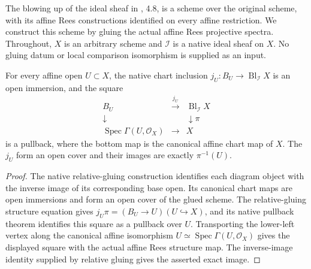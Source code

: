 \endgroup

\begingroup

The blowing up of the ideal sheaf in \cite{deJong1996}, 4.8, is a
scheme over the original scheme, with its affine Rees constructions
identified on every affine restriction. We construct this scheme by
gluing the actual affine Rees projective spectra. Throughout, $X$ is
an arbitrary scheme and $\mathcal I$ is a native ideal sheaf on $X$.
No gluing datum or local comparison isomorphism is supplied as an input.

\begin{theorem}
\label{thm:global-native-blowup-affine-pullback}
\leanok
For every affine open $U\subset X$, the native chart inclusion
$j_U:B_U\to\operatorname{Bl}_{\mathcal I}X$ is an open immersion,
and the square
\[
\begin{array}{ccc}
B_U&\xrightarrow{j_U}&\operatorname{Bl}_{\mathcal I}X\\
\downarrow&&\downarrow\pi\\
\operatorname{Spec}\Gamma(U,\mathcal O_X)&\longrightarrow&X
\end{array}
\]
is a pullback, where the bottom map is the canonical affine chart
map of $X$. The $j_U$ form an open cover and their images are exactly
$\pi^{-1}(U)$.
\end{theorem}
\begin{proof}
The native relative-gluing construction identifies each diagram
object with the inverse image of its corresponding base open.
Its canonical chart maps are open immersions and form an open cover
of the glued scheme. The relative-gluing structure equation gives
$j_U\pi=(B_U\to U)(U\hookrightarrow X)$, and its native pullback
theorem identifies this square as a pullback over $U$. Transporting
the lower-left vertex along the canonical affine isomorphism
$U\simeq\operatorname{Spec}\Gamma(U,\mathcal O_X)$ gives the displayed
square with the actual affine Rees structure map. The inverse-image
identity supplied by relative gluing gives the asserted exact image.
\end{proof}
\endgroup

